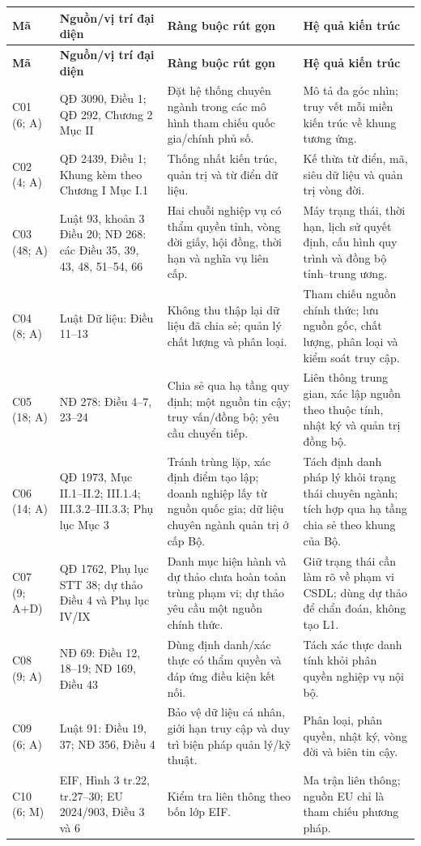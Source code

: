 \documentclass[a4paper,11pt]{article}
\begin{document}
\small
\renewcommand{\arraystretch}{1.02}
\setlength{\tabcolsep}{2.3pt}
\begin{longtable}{@{}p{1.15cm}p{4.0cm}p{4.9cm}p{4.35cm}@{}}
\toprule
\textbf{Mã} & \textbf{Nguồn/vị trí đại diện} & \textbf{Ràng buộc rút gọn} & \textbf{Hệ quả kiến trúc} \\
\midrule
\endfirsthead
\toprule
\textbf{Mã} & \textbf{Nguồn/vị trí đại diện} & \textbf{Ràng buộc rút gọn} & \textbf{Hệ quả kiến trúc} \\
\midrule
\endhead
\bottomrule
\endfoot
C01 (6; A) & QĐ 3090, Điều 1; QĐ 292, Chương 2 Mục II & Đặt hệ thống chuyên ngành trong các mô hình tham chiếu quốc gia/chính phủ số. & Mô tả đa góc nhìn; truy vết mỗi miền kiến trúc về khung tương ứng. \\
\addlinespace
C02 (4; A) & QĐ 2439, Điều 1; Khung kèm theo Chương I Mục I.1 & Thống nhất kiến trúc, quản trị và từ điển dữ liệu. & Kế thừa từ điển, mã, siêu dữ liệu và quản trị vòng đời. \\
\addlinespace
C03 (48; A) & Luật 93, khoản 3 Điều 20; NĐ 268: các Điều 35, 39, 43, 48, 51--54, 66 & Hai chuỗi nghiệp vụ có thẩm quyền tỉnh, vòng đời giấy, hội đồng, thời hạn và nghĩa vụ liên cấp. & Máy trạng thái, thời hạn, lịch sử quyết định, cấu hình quy trình và đồng bộ tỉnh--trung ương. \\
\addlinespace
C04 (8; A) & Luật Dữ liệu: Điều 11--13 & Không thu thập lại dữ liệu đã chia sẻ; quản lý chất lượng và phân loại. & Tham chiếu nguồn chính thức; lưu nguồn gốc, chất lượng, phân loại và kiểm soát truy cập. \\
\addlinespace
C05 (18; A) & NĐ 278: Điều 4--7, 23--24 & Chia sẻ qua hạ tầng quy định; một nguồn tin cậy; truy vấn/đồng bộ; yêu cầu chuyển tiếp. & Liên thông trung gian, xác lập nguồn theo thuộc tính, nhật ký và quản trị đồng bộ. \\
\addlinespace
C06 (14; A) & QĐ 1973, Mục II.1--II.2; III.1.4; III.3.2--III.3.3; Phụ lục Mục 3 & Tránh trùng lặp, xác định điểm tạo lập; doanh nghiệp lấy từ nguồn quốc gia; dữ liệu chuyên ngành quản trị ở cấp Bộ. & Tách định danh pháp lý khỏi trạng thái chuyên ngành; tích hợp qua hạ tầng chia sẻ theo khung của Bộ. \\
\addlinespace
C07 (9; A+D) & QĐ 1762, Phụ lục STT 38; dự thảo Điều 4 và Phụ lục IV/IX & Danh mục hiện hành và dự thảo chưa hoàn toàn trùng phạm vi; dự thảo yêu cầu một nguồn chính thức. & Giữ trạng thái cần làm rõ về phạm vi CSDL; dùng dự thảo để chẩn đoán, không tạo L1. \\
\addlinespace
C08 (9; A) & NĐ 69: Điều 12, 18--19; NĐ 169, Điều 43 & Dùng định danh/xác thực có thẩm quyền và đáp ứng điều kiện kết nối. & Tách xác thực danh tính khỏi phân quyền nghiệp vụ nội bộ. \\
\addlinespace
C09 (6; A) & Luật 91: Điều 19, 37; NĐ 356, Điều 4 & Bảo vệ dữ liệu cá nhân, giới hạn truy cập và duy trì biện pháp quản lý/kỹ thuật. & Phân loại, phân quyền, nhật ký, vòng đời và biên tin cậy. \\
\addlinespace
C10 (6; M) & EIF, Hình 3 tr.22, tr.27--30; EU 2024/903, Điều 3 và 6 & Kiểm tra liên thông theo bốn lớp EIF. & Ma trận liên thông; nguồn EU chỉ là tham chiếu phương pháp. \\
\end{longtable}
\normalsize
\end{document}
